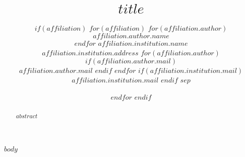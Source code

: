 \documentclass[$if(classoption)$$classoption$$else$10pt,twocolumn,letterpaper$endif$]{article}
\begin{document}
\title{$title$}

\author{
$if(affiliation)$
$for(affiliation)$
$for(affiliation.author)$
$affiliation.author.name$\\
$endfor$
$affiliation.institution.name$ \\
$affiliation.institution.address$
$for(affiliation.author)$
$if(affiliation.author.mail)$
\\{\tt\small $affiliation.author.mail$}
$endif$
$endfor$
$if(affiliation.institution.mail)$
\\{\tt\small $affiliation.institution.mail$}
$endif$
$sep$\and
$endfor$
$endif$
}

\maketitle

\begin{abstract}
   $abstract$
\end{abstract}

$body$

{\small


}
\end{document}
